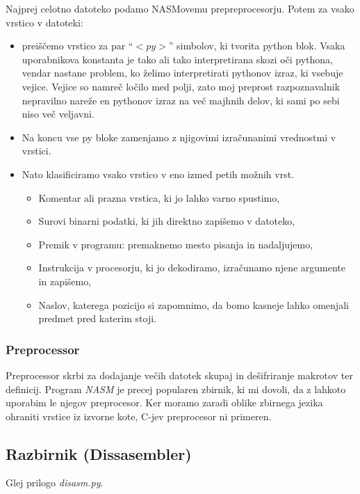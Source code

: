 \documentclass[12pt]{article}
\begin{document}
Najprej celotno datoteko podamo NASMovemu prepreprocesorju.
Potem za vsako vrstico v datoteki:
\begin{itemize}
  \item preiščemo vrstico za par ``$<py>$'' simbolov, ki tvorita python blok.
  Vsaka uporabnikova konstanta je tako ali tako interpretirana skozi oči pythona, vendar nastane problem, ko želimo interpretirati pythonov izraz, ki vsebuje vejice.
  Vejice so namreč ločilo med polji, zato moj preprost razpoznavalnik nepravilno nareže en pythonov izraz na več majhnih delov, ki sami po sebi niso več veljavni.
  \item Na koncu vse py bloke zamenjamo z njigovimi izračunanimi vrednostmi v vrstici.
  \item Nato klasificiramo vsako vrstico v eno izmed petih možnih vrst.
  \begin{itemize}
    \item Komentar ali prazna vrstica, ki jo lahko varno spustimo,
    \item Surovi binarni podatki, ki jih direktno zapišemo v datoteko,
    \item Premik v programu: premaknemo mesto pisanja in nadaljujemo,
    \item Instrukcija v procesorju, ki jo dekodiramo, izračunamo njene argumente in zapišemo,
    \item Naslov, katerega pozicijo si zapomnimo, da bomo kasneje lahko omenjali predmet pred katerim stoji.
  \end{itemize}
\end{itemize}

\subsubsection{Preprocessor}
Preprocessor skrbi za dodajanje večih datotek skupaj in dešifriranje makrotov ter definicij.
Program \textit{NASM} je precej popularen zbirnik, ki mi dovoli, da z lahkoto uporabim le njegov preprocesor.
Ker moramo zaradi oblike zbirnega jezika ohraniti vrstice iz izvorne kote, C-jev preprocesor ni primeren.

\subsection{Razbirnik (Dissasembler)}
Glej prilogo \textit{disasm.py}.
\end{document}
